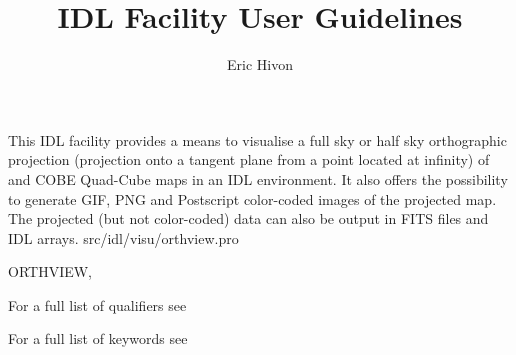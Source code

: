 




\sloppy



\title{\healpix IDL Facility User Guidelines}
 \section[orthview]{ }
\label{idl:\thedocid}
\author{Eric Hivon}



\begin{facility}
{This IDL facility provides a means to visualise a full sky or half sky orthographic projection 
(projection onto a tangent plane from a point located at infinity) of
\healpix and COBE Quad-Cube maps in an IDL environment. 
It also offers the possibility to
generate GIF, PNG and Postscript color-coded images of the projected map.
The projected (but not color-coded) data can also be output in FITS files and
IDL arrays.}
{src/idl/visu/orthview.pro}
\end{facility}

\begin{IDLformat}
{ORTHVIEW, 
\normalsize{
}
}
\end{IDLformat}

\begin{qualifiers}
  \begin{qulist}{} %
\item [{\  }] For a full list of qualifiers see 
  \end{qulist}
\end{qualifiers}

\begin{keywords}
  \begin{kwlist}{} %
\item [{\  }] For a full list of keywords see 
  \end{kwlist}
\end{keywords}


